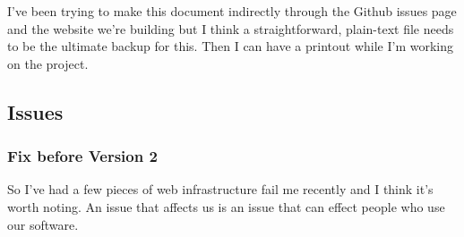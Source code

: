\documentclass[a4paper, 11pt]{report}
\begin{document}
I've been trying to make this document indirectly through the Github
issues page and the website we're building but I think a
straightforward, plain-text file needs to be the ultimate backup for
this. Then I can have a printout while I'm working on the project.

\hypertarget{issues-1}{%
\subsection{Issues}\label{issues-1}}

\hypertarget{fix-before-version-2-1}{%
\subsubsection{Fix before Version 2}\label{fix-before-version-2-1}}

So I've had a few pieces of web infrastructure fail me recently and I
think it's worth noting. An issue that affects us is an issue that can
effect people who use our software.
\end{document}
